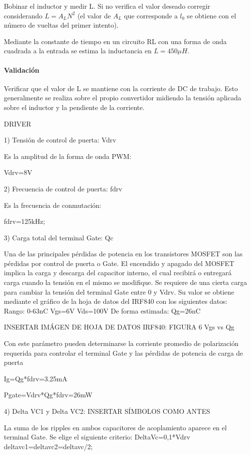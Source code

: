 Bobinar el inductor y medir L. Si no verifica el valor deseado corregir
considerando $L = A_LN^2$ (el valor de $A_L$ que corresponde a $l_0$ se obtiene con
el número de vueltas del primer intento).

Mediante la constante de tiempo en un circuito RL con una forma de onda cuadrada a la entrada se estima la inductancia en $L=450\mu H$. 

\paragraph{Validación}

Verificar que el valor de L se mantiene con la corriente de DC de trabajo.
Esto generalmente se realiza sobre el propio convertidor midiendo la
tensión aplicada sobre el inductor y la pendiente de la corriente.

DRIVER

1) Tensión de control de puerta: Vdrv

Es la amplitud de la forma de onda PWM:  

Vdrv=8V

2) Frecuencia de control de puerta: fdrv

Es la frecuencia de conmutación: 

fdrv=125kHz;

3) Carga total del terminal Gate: Qc

Una de las principales pérdidas de potencia en los transistores MOSFET son las pérdidas por control de puerta o Gate. 
El encendido y apagado del MOSFET implica la carga y descarga del capacitor interno, 
el cual recibirá o entregará carga cuando la tensión en el mismo se modifique. 
Se requiere de una cierta carga para cambiar la tensión del terminal Gate entre 0 y Vdrv. 
Su valor se obtiene mediante el gráfico de la hoja de datos del IRF840 con los siguientes datos:
Rango: 0-63nC
Vgs=6V
Vds=100V
De forma estimada: 
Qg=26nC

INSERTAR IMÁGEN DE HOJA DE DATOS IRF840: FIGURA 6 Vgs vs Qg

Con este parámetro pueden determinarse la corriente promedio de polarización requerida para controlar el terminal Gate 
y las pérdidas de potencia de carga de puerta

Ig=Qg*fdrv=3.25mA

Pgate=Vdrv*Qg*fdrv=26mW

4) Delta VC1 y Delta VC2: INSERTAR SÍMBOLOS COMO ANTES

La suma de los ripples en ambos capacitores de acoplamiento aparece en el terminal Gate. 
Se elige el siguiente criterio:
DeltaVc=0,1*Vdrv
deltavc1=deltavc2=deltavc/2;

